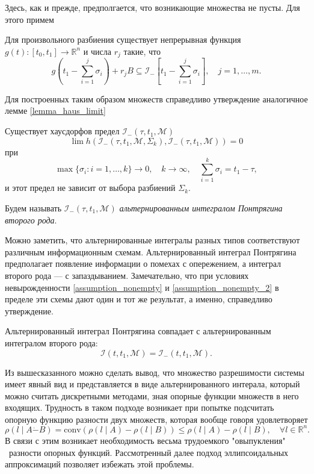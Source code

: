 Здесь, как и прежде, предполгается, что возникающие множества не пусты. Для этого примем
\begin{assumption}\label{assumption_nonempty_2}
    Для произвольного разбиения существует непрерывная функция \( g(t) : [t_0, t_1] \to \mathbb{R}^n \)
     и числа \( r_j \) такие, что
    \begin{equation*}
        g \left(t_1 - \sum_{i = 1}^j \sigma_i \right) + r_j B \subseteq \mathcal{I}_-\left[ t_1 - 
         \sum_{i = 1}^j \sigma_i \right], \quad j = 1, \dots, m.
    \end{equation*}
\end{assumption}

Для построенных таким образом множеств справедливо утверждение аналогичное лемме \eqref{lemma_haus_limit}

\begin{lemma}
    Существует хаусдорфов предел \( \mathcal{I}_-(\tau, t_1, \mathcal{M}) \)
    \[
        \lim h \left( \mathcal{I}_-(\tau, t_1, \mathcal{M}, \Sigma_k), \mathcal{I}_-(\tau, t_1,
         \mathcal{M}) \right) = 0    
    \]
    при
    \[
        \max\{\sigma_i : i = 1, \dots, k \} \to 0, \quad k \to \infty, \quad \sum_{i = 1}^k 
         \sigma_i = t_1 - \tau,
    \]
    и этот предел не зависит от выбора разбиений \( \Sigma_k \).
\end{lemma}

Будем называть \( \mathcal{I}_-(\tau, t_1, \mathcal{M}) \) \emph{альтернированным 
 интегралом Понтрягина второго рода}.

Можно заметить, что альтернированные интегралы разных типов соответствуют различным 
 информационным схемам. Альтернированный интеграл Понтрягина предполагает появление 
 информации о помехах с опережением, а интеграл второго рода --- с запаздыванием. 
 Замечательно, что при условиях невырожденности \eqref{assumption_nonempty} и 
 \eqref{assumption_nonempty_2} в пределе эти схемы дают один и тот же результат, а именно,
 справедливо утверждение.

\begin{theorem}
    Альтернированный интеграл Понтрягина совпадает с альтернированным интегралом второго рода:
    \begin{equation*}
        \mathcal{I}(t, t_1, \mathcal{M}) = \mathcal{I}_-(t, t_1, \mathcal{M}).
    \end{equation*}
\end{theorem}

Из вышесказанного можно сделать вывод, что множество разрешимости системы имеет явный вид и
 представляется в виде альтернированного интерала, который можно считать дискретными методами,
 зная опорные функции множеств в него входящих. Трудность в таком подходе возникает при попытке
 подсчитать опорную функцию разности двух множеств, которая вообще говоря удовлетворяет
\begin{equation*}
    \rho(l \mid A \dot{-} B) = \text{conv}( \rho(l \mid A) - \rho(l \mid B)) \le \rho(l \mid A) -
      \rho(l \mid B), \quad \forall l \in \mathbb{R}^n.
\end{equation*}
В связи с этим возникает необходимость весьма трудоемкого "овыпукления" \ разности опорных функций.
Рассмотренный далее подход эллипсоидальных аппроксимаций позволяет избежать этой проблемы.

